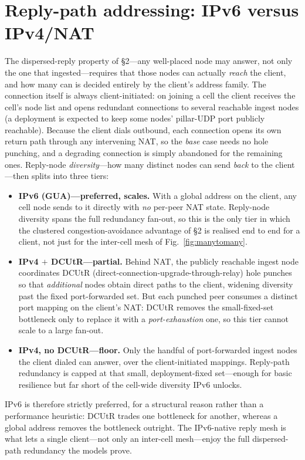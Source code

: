 \documentclass[10pt,twocolumn]{article}
\begin{document}
\section{Reply-path addressing: IPv6 versus IPv4/NAT}\label{sec:replypath}
The dispersed-reply property of \S2---any well-placed node may answer, not only
the one that ingested---requires that those nodes can actually \emph{reach} the
client, and how many can is decided entirely by the client's address family. The
connection itself is always client-initiated: on joining a cell the client
receives the cell's node list and opens redundant connections to several
reachable ingest nodes (a deployment is expected to keep some nodes' pillar-UDP
port publicly reachable). Because the client dials outbound, each connection
opens its own return path through any intervening NAT, so the \emph{base} case
needs no hole punching, and a degrading connection is simply abandoned for the
remaining ones. Reply-node \emph{diversity}---how many distinct nodes can send
\emph{back} to the client---then splits into three tiers:
\begin{itemize}\itemsep2pt
  \item \textbf{IPv6 (GUA)---preferred, scales.} With a global address on the
  client, any cell node sends to it directly with \emph{no} per-peer NAT state.
  Reply-node diversity spans the full redundancy fan-out, so this is the only
  tier in which the clustered congestion-avoidance advantage of \S2 is realised
  end to end for a client, not just for the inter-cell mesh of
  Fig.~\ref{fig:manytomany}.
  \item \textbf{IPv4 $+$ DCUtR---partial.} Behind NAT, the publicly reachable
  ingest node coordinates DCUtR (direct-connection-upgrade-through-relay) hole
  punches so that \emph{additional} nodes obtain direct paths to the client,
  widening diversity past the fixed port-forwarded set. But each punched peer
  consumes a distinct port mapping on the client's NAT: DCUtR removes the
  small-fixed-set bottleneck only to replace it with a \emph{port-exhaustion}
  one, so this tier cannot scale to a large fan-out.
  \item \textbf{IPv4, no DCUtR---floor.} Only the handful of port-forwarded
  ingest nodes the client dialed can answer, over the client-initiated mappings.
  Reply-path redundancy is capped at that small, deployment-fixed set---enough
  for basic resilience but far short of the cell-wide diversity IPv6 unlocks.
\end{itemize}
IPv6 is therefore strictly preferred, for a structural reason rather than a
performance heuristic: DCUtR trades one bottleneck for another, whereas a global
address removes the bottleneck outright. The IPv6-native reply mesh is what lets
a single client---not only an inter-cell mesh---enjoy the full dispersed-path
redundancy the models prove.
\end{document}
